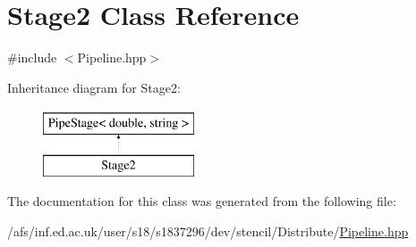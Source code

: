 \hypertarget{classStage2}{\section{Stage2 Class Reference}
\label{classStage2}
}


{\ttfamily \#include $<$Pipeline.\-hpp$>$}

Inheritance diagram for Stage2\-:\begin{figure}[H]
\begin{center}
\leavevmode
\includegraphics[height=2.000000cm]{classStage2}
\end{center}
\end{figure}


The documentation for this class was generated from the following file\-:\begin{DoxyCompactItemize}
\item 
/afs/inf.\-ed.\-ac.\-uk/user/s18/s1837296/dev/stencil/\-Distribute/\hyperlink{Pipeline_8hpp}{Pipeline.\-hpp}\end{DoxyCompactItemize}
